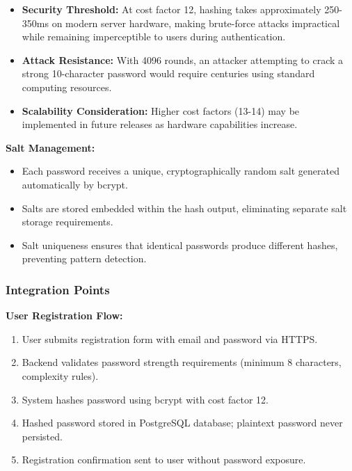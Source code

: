 \documentclass[12pt,a4paper]{article}
\begin{document}
\begin{itemize}[leftmargin=2em, itemsep=6pt]
    \item \textbf{Security Threshold:} At cost factor 12, hashing takes approximately 250-350ms on modern server hardware, making brute-force attacks impractical while remaining imperceptible to users during authentication.
    \item \textbf{Attack Resistance:} With 4096 rounds, an attacker attempting to crack a strong 10-character password would require centuries using standard computing resources.
    \item \textbf{Scalability Consideration:} Higher cost factors (13-14) may be implemented in future releases as hardware capabilities increase.
\end{itemize}

\vspace{0.5em}

\textbf{Salt Management:}

\begin{itemize}[leftmargin=2em, itemsep=6pt]
    \item Each password receives a unique, cryptographically random salt generated automatically by bcrypt.
    \item Salts are stored embedded within the hash output, eliminating separate salt storage requirements.
    \item Salt uniqueness ensures that identical passwords produce different hashes, preventing pattern detection.
\end{itemize}

\subsubsection{Integration Points}

\textbf{User Registration Flow:}

\begin{enumerate}[leftmargin=2em, itemsep=6pt]
    \item User submits registration form with email and password via HTTPS.
    \item Backend validates password strength requirements (minimum 8 characters, complexity rules).
    \item System hashes password using bcrypt with cost factor 12.
    \item Hashed password stored in PostgreSQL database; plaintext password never persisted.
    \item Registration confirmation sent to user without password exposure.
\end{enumerate}
\end{document}

